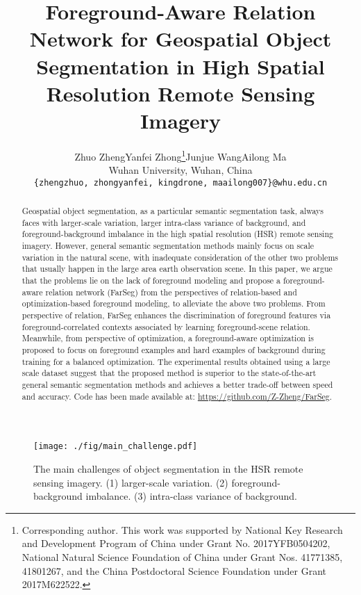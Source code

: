 \documentclass[10pt,twocolumn,letterpaper]{article}
\begin{document}
\title{Foreground-Aware Relation Network for Geospatial Object Segmentation in High Spatial Resolution Remote Sensing Imagery}

\author{Zhuo Zheng\qquad Yanfei Zhong\thanks{Corresponding author. This work was supported by National Key Research and Development
Program of China under Grant No. 2017YFB0504202, National Natural Science Foundation of China under Grant Nos. 41771385, 41801267, and the China Postdoctoral Science Foundation under Grant 2017M622522.}\qquad Junjue Wang\qquad Ailong Ma\\
Wuhan University, Wuhan, China\\
{\tt\small \{zhengzhuo, zhongyanfei, kingdrone, maailong007\}@whu.edu.cn}
}

\maketitle
\thispagestyle{empty}

\begin{abstract}
   Geospatial object segmentation, as a particular semantic segmentation task, always faces with larger-scale variation, larger intra-class variance of background, and foreground-background imbalance in the high spatial resolution (HSR) remote sensing imagery.
   However, general semantic segmentation methods mainly focus on scale variation in the natural scene, with inadequate consideration of the other two problems that usually happen in the large area earth observation scene. 
   In this paper, we argue that the problems lie on the lack of foreground modeling and propose a foreground-aware relation network (FarSeg) from the perspectives of relation-based and optimization-based foreground modeling, to alleviate the above two problems.
   From perspective of relation, FarSeg enhances the discrimination of foreground features via foreground-correlated contexts associated by learning foreground-scene relation.
   Meanwhile, from perspective of optimization, a foreground-aware optimization is proposed to focus on foreground examples and hard examples of background during training for a balanced optimization.
   The experimental results obtained using a large scale dataset suggest that the proposed method is superior to the state-of-the-art general semantic segmentation methods and achieves a better trade-off between speed and accuracy.
   Code has been made available at: \url{https://github.com/Z-Zheng/FarSeg}.
\end{abstract}
\begin{figure}[hbt]
   \begin{center}
      \texttt{[image: ./fig/main\_challenge.pdf]}
   \end{center}
   \caption{The main challenges of object segmentation in the HSR remote sensing imagery. (1) larger-scale variation. (2) foreground-background imbalance. (3) intra-class variance of background.}
   \label{fig:coco_voc_isaid}
\end{figure}
\end{document}
